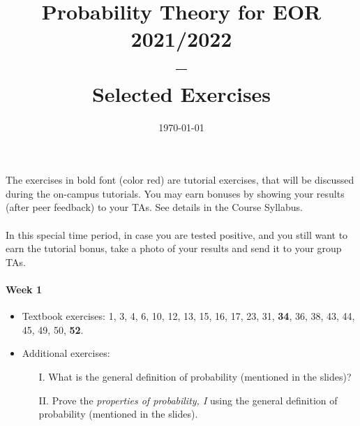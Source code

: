 \documentclass[12pt,english]{exam}
\title{Probability Theory for EOR 2021/2022\\
--\\
Selected Exercises\\}
\date{\today}
\begin{document}
	\maketitle
The exercises in bold font (color red) are tutorial exercises, that will be discussed during the on-campus tutorials. You may earn bonuses by showing your results (after peer feedback) to your TAs. See details in the Course Syllabus. \\~\\
In this special time period, in case you are tested positive, and you still want to earn the tutorial bonus, take a photo of your results and send it to your group TAs. 
\paragraph{Week 1} 
\begin{itemize}
	\item Textbook exercises: 1, 3, 4, 6, 10, 12, 13, 15, 16, 17, 23, 31, \textbf{\color{red} 34}, 36, 38, 43, 44, 45, 49, 50, \textbf{\color{red} 52}.
	\item Additional exercises:
	\begin{itemize}
		\item[I.] What is the general definition of probability (mentioned in the slides)?
		\item[II.] Prove the \textit{properties of probability, I} using the general definition of probability (mentioned in the slides).   
	\end{itemize}
\end{itemize}
 
\end{document}
